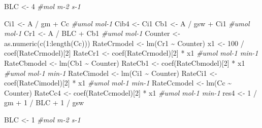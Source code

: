 \documentclass[
]{krantz}
\makeatletter
\newenvironment{Shaded}{\begin{snugshade}}{\end{snugshade}}
\newcommand{\CommentTok}[1]{\textcolor[rgb]{0.56,0.35,0.01}{\textit{#1}}}
\newcommand{\DecValTok}[1]{\textcolor[rgb]{0.00,0.00,0.81}{#1}}
\newcommand{\FunctionTok}[1]{\textcolor[rgb]{0.00,0.00,0.00}{#1}}
\newcommand{\NormalTok}[1]{#1}
\newcommand{\OtherTok}[1]{\textcolor[rgb]{0.56,0.35,0.01}{#1}}
\newcommand{\SpecialCharTok}[1]{\textcolor[rgb]{0.00,0.00,0.00}{#1}}
\newenvironment{kframe}{%
\medskip{}
\setlength{\fboxsep}{.8em}
 \def\at@end@of@kframe{}%
 \ifinner\ifhmode%
  \def\at@end@of@kframe{\end{minipage}}%
  \begin{minipage}{\columnwidth}%
 \fi\fi%
 \def\FrameCommand##1{\hskip\@totalleftmargin \hskip-\fboxsep
 \colorbox{shadecolor}{##1}\hskip-\fboxsep
     \hskip-\linewidth \hskip-\@totalleftmargin \hskip\columnwidth}%
 \MakeFramed {\advance\hsize-\width
   \@totalleftmargin\z@ \linewidth\hsize
   \@setminipage}}%
 {\par\unskip\endMakeFramed%
 \at@end@of@kframe}
\renewenvironment{Shaded}{\begin{kframe}}{\end{kframe}}
\makeatother
\begin{document}
\begin{Shaded}
\begin{Highlighting}[]
\NormalTok{BLC }\OtherTok{\textless{}{-}} \DecValTok{4} \CommentTok{\#mol m{-}2 s{-}1}

\NormalTok{Ci1 }\OtherTok{\textless{}{-}}\NormalTok{ A }\SpecialCharTok{/}\NormalTok{ gm }\SpecialCharTok{+}\NormalTok{ Cc }\CommentTok{\#umol mol{-}1}
\NormalTok{Cib4 }\OtherTok{\textless{}{-}}\NormalTok{ Ci1}
\NormalTok{Cb1 }\OtherTok{\textless{}{-}}\NormalTok{ A }\SpecialCharTok{/}\NormalTok{ gsw }\SpecialCharTok{+}\NormalTok{ Ci1 }\CommentTok{\#umol mol{-}1}
\NormalTok{Cr1 }\OtherTok{\textless{}{-}}\NormalTok{ A }\SpecialCharTok{/}\NormalTok{ BLC }\SpecialCharTok{+}\NormalTok{ Cb1 }\CommentTok{\#umol mol{-}1}
\NormalTok{Counter }\OtherTok{\textless{}{-}} \FunctionTok{as.numeric}\NormalTok{(}\FunctionTok{c}\NormalTok{(}\DecValTok{1}\SpecialCharTok{:}\FunctionTok{length}\NormalTok{(Cc)))}
\NormalTok{RateCrmodel }\OtherTok{\textless{}{-}} \FunctionTok{lm}\NormalTok{(Cr1 }\SpecialCharTok{\textasciitilde{}}\NormalTok{ Counter)}
\NormalTok{x1 }\OtherTok{\textless{}{-}} \DecValTok{100} \SpecialCharTok{/} \FunctionTok{coef}\NormalTok{(RateCrmodel)[}\DecValTok{2}\NormalTok{]}
\NormalTok{RateCr1 }\OtherTok{\textless{}{-}} \FunctionTok{coef}\NormalTok{(RateCrmodel)[}\DecValTok{2}\NormalTok{] }\SpecialCharTok{*}\NormalTok{ x1 }\CommentTok{\#umol mol{-}1 min{-}1}
\NormalTok{RateCbmodel }\OtherTok{\textless{}{-}} \FunctionTok{lm}\NormalTok{(Cb1 }\SpecialCharTok{\textasciitilde{}}\NormalTok{ Counter)}
\NormalTok{RateCb1 }\OtherTok{\textless{}{-}} \FunctionTok{coef}\NormalTok{(RateCbmodel)[}\DecValTok{2}\NormalTok{] }\SpecialCharTok{*}\NormalTok{ x1 }\CommentTok{\#umol mol{-}1 min{-}1}
\NormalTok{RateCimodel }\OtherTok{\textless{}{-}} \FunctionTok{lm}\NormalTok{(Ci1 }\SpecialCharTok{\textasciitilde{}}\NormalTok{ Counter)}
\NormalTok{RateCi1 }\OtherTok{\textless{}{-}} \FunctionTok{coef}\NormalTok{(RateCimodel)[}\DecValTok{2}\NormalTok{] }\SpecialCharTok{*}\NormalTok{ x1 }\CommentTok{\#umol mol{-}1 min{-}1}
\NormalTok{RateCcmodel }\OtherTok{\textless{}{-}} \FunctionTok{lm}\NormalTok{(Cc }\SpecialCharTok{\textasciitilde{}}\NormalTok{ Counter)}
\NormalTok{RateCc4 }\OtherTok{\textless{}{-}} \FunctionTok{coef}\NormalTok{(RateCcmodel)[}\DecValTok{2}\NormalTok{] }\SpecialCharTok{*}\NormalTok{ x1 }\CommentTok{\#umol mol{-}1 min{-}1}
\NormalTok{res4 }\OtherTok{\textless{}{-}} \DecValTok{1} \SpecialCharTok{/}\NormalTok{ gm }\SpecialCharTok{+} \DecValTok{1} \SpecialCharTok{/}\NormalTok{ BLC }\SpecialCharTok{+} \DecValTok{1} \SpecialCharTok{/}\NormalTok{ gsw}

\NormalTok{BLC }\OtherTok{\textless{}{-}} \DecValTok{1} \CommentTok{\#mol m{-}2 s{-}1}


\end{Highlighting}
\end{Shaded}
\end{document}

